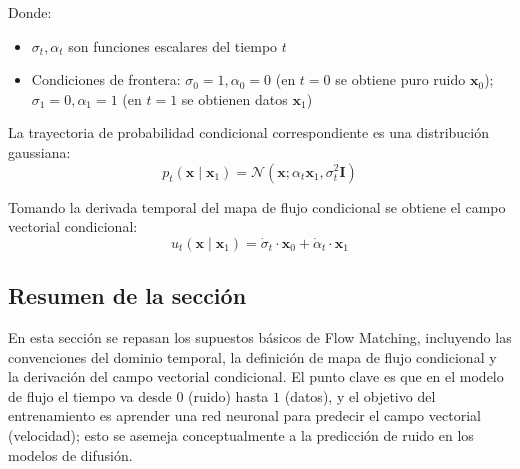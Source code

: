 Donde:
\begin{itemize}
    \item $\sigma_t, \alpha_t$ son funciones escalares del tiempo $t$
    \item Condiciones de frontera: $\sigma_0 = 1, \alpha_0 = 0$ (en $t=0$ se obtiene puro ruido $\mathbf{x}_0$); $\sigma_1 = 0, \alpha_1 = 1$ (en $t=1$ se obtienen datos $\mathbf{x}_1$)
\end{itemize}

La trayectoria de probabilidad condicional correspondiente es una distribución gaussiana:
$$p_t(\mathbf{x} \mid \mathbf{x}_1) = \mathcal{N}(\mathbf{x}; \alpha_t \mathbf{x}_1, \sigma_t^2 \mathbf{I})$$

Tomando la derivada temporal del mapa de flujo condicional se obtiene el campo vectorial condicional:
$$u_t(\mathbf{x} \mid \mathbf{x}_1) = \dot{\sigma}_t \cdot \mathbf{x}_0 + \dot{\alpha}_t \cdot \mathbf{x}_1$$

\subsection{Resumen de la sección}

En esta sección se repasan los supuestos básicos de Flow Matching, incluyendo las convenciones del dominio temporal, la definición de mapa de flujo condicional y la derivación del campo vectorial condicional. El punto clave es que en el modelo de flujo el tiempo va desde $0$ (ruido) hasta $1$ (datos), y el objetivo del entrenamiento es aprender una red neuronal para predecir el campo vectorial (velocidad); esto se asemeja conceptualmente a la predicción de ruido en los modelos de difusión.

